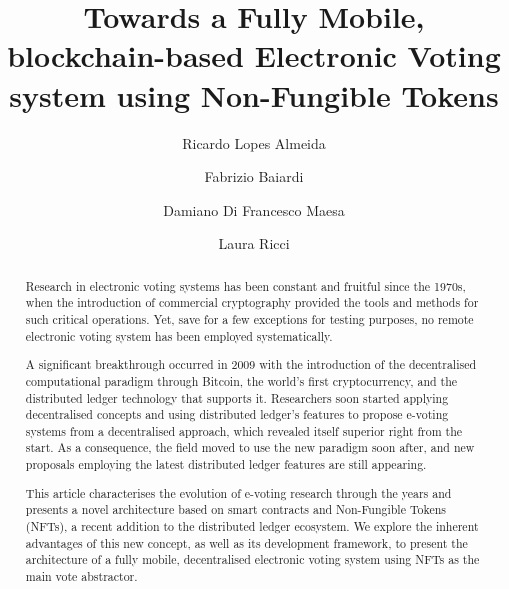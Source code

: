 \documentclass[10pt]{article}
\author[1]{Ricardo Lopes Almeida}
\author[2]{Fabrizio Baiardi}
\author[3]{Damiano Di Francesco Maesa}
\author[4]{Laura Ricci}
\affil[1, 2, 3, 4]{Dipartimento di Informatica, Università di Pisa, Italia}
\affil[1]{Università di Camerino, Italia}
\title{Towards a Fully Mobile, blockchain-based Electronic Voting system using Non-Fungible Tokens}
\begin{document}
\maketitle

\begin{abstract}
    Research in electronic voting systems has been constant and fruitful since the 1970s, when the introduction of commercial cryptography provided the tools and methods for such critical operations. Yet, save for a few exceptions for testing purposes, no remote electronic voting system has been employed systematically.
    \par
    A significant breakthrough occurred in 2009 with the introduction of the decentralised computational paradigm through Bitcoin, the world's first cryptocurrency, and the distributed ledger technology that supports it. Researchers soon started applying decentralised concepts and using distributed ledger's features to propose e-voting systems from a decentralised approach, which revealed itself superior right from the start. As a consequence, the field moved to use the new paradigm soon after, and new proposals employing the latest distributed ledger features are still appearing.
    \par
    This article characterises the evolution of e-voting research through the years and presents a novel architecture based on smart contracts and Non-Fungible Tokens (NFTs), a recent addition to the distributed ledger ecosystem. We explore the inherent advantages of this new concept, as well as its development framework, to present the architecture of a fully mobile, decentralised electronic voting system using NFTs as the main vote abstractor.
\end{abstract}

















\printbibliography
\end{document}

